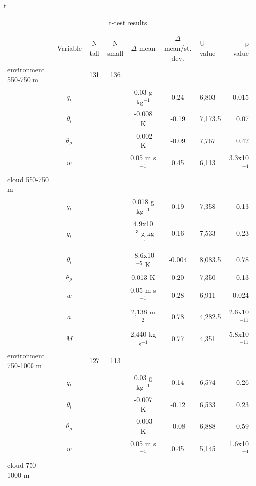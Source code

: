 \documentclass[acp]{copernicus}
\begin{document}


t
\begin{table}[t]
\label{tbl:mannwhitneyu}
\caption{t-test results}
\vskip4mm
\centering
\begin{tabular}{lccccclr}
\tophline
& Variable & N tall & N small & $\Delta$ mean & $\Delta$ mean/st. dev. & U value & p value\\
\middlehline
environment 550-750 m & & 131 & 136 & & & & \\
& $q_t$       & & &  0.03 g kg$^{-1}$          &  0.24 & 6,803   & 0.015    \\ 
& $\theta_l$ & & & -0.008 K                   & -0.19 & 7,173.5 & 0.07    \\
& $\theta_\rho$ & & & -0.002 K               & -0.09 & 7,767   & 0.42    \\
& $w$         & & &  0.05 m s$^{-1}$           &  0.45 & 6,113   & 3.3x10$^{-4}$ \\
cloud 550-750 m & & & & & & \\
& $q_t$       & & &  0.018 g kg$^{-1}$         &  0.19 & 7,358   & 0.13   \\
& $q_l$       & & &  4.9x10$^{-3}$ g kg$^{-1}$ &  0.16 & 7,533   & 0.23   \\
& $\theta_l$ & & & -8.6x10$^{-5}$ K           & -0.004 & 8,083.5 & 0.78 \\
& $\theta_\rho$ & & &  0.013 K               &  0.20 & 7,350   & 0.13  \\
& $w$         & & &  0.05 m s$^{-1}$           &  0.28 & 6,911   & 0.024  \\
& $a$         & & &  2,138 m$^2$                &  0.78 & 4,282.5 & 2.6x10$^{-11}$ \\
& $M$         & & &  2,440 kg s$^{-1}$    &  0.77 & 4,351 & 5.8x10$^{-11}$ \\
environment 750-1000 m & & 127 & 113 & & & & \\
& $q_t$       & & &  0.03 g kg$^{-1}$          &  0.14 & 6,574 & 0.26    \\
& $\theta_l$ & & & -0.007 K                   & -0.12 & 6,533 & 0.23    \\
& $\theta_\rho$ & & & -0.003 K               & -0.08 & 6,888 & 0.59    \\
& $w$         & & &  0.05 m s$^{-1}$           &  0.45 & 5,145 & 1.6x10$^{-4}$ \\
cloud 750-1000 m & & & & & &          \\

\end{tabular}
\end{table}
\end{document}
